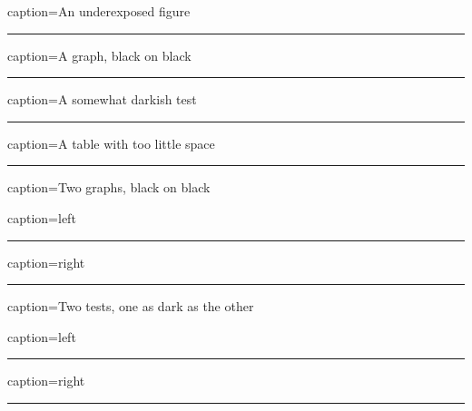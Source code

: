 \documentclass{article}
\begin{document}
\begin{figureobject}{caption=An underexposed figure}
	\rule{.7\linewidth}{.3\linewidth}
\end{figureobject}
\begin{graphobject}{caption={A graph, black on black}}
	\rule{.7\linewidth}{.3\linewidth}
\end{graphobject}
\begin{testobject}{caption=A somewhat darkish test}
	\rule{.7\linewidth}{.3\linewidth}
\end{testobject}
\begin{tableobject}{caption=A table with too little space}
	\rule{.7\linewidth}{.3\linewidth}
\end{tableobject}

\clearpage
\begin{graphobject}{caption={Two graphs, black on black}}
	\begin{subobject}{caption=left}
	\rule{.7\linewidth}{.3\linewidth}
	\end{subobject}
	\begin{subobject}{caption=right}
	\rule{.7\linewidth}{.3\linewidth}
	\end{subobject}
\end{graphobject}
\begin{testobject}{caption={Two tests, one as dark as the other}}
	\begin{subobject}{caption=left}
	\rule{.7\linewidth}{.3\linewidth}
	\end{subobject}
	\begin{subobject}{caption=right}
	\rule{.7\linewidth}{.3\linewidth}
	\end{subobject}
\end{testobject}

\clearpage
\listoffigures
{}
\listoftables
\end{document}

